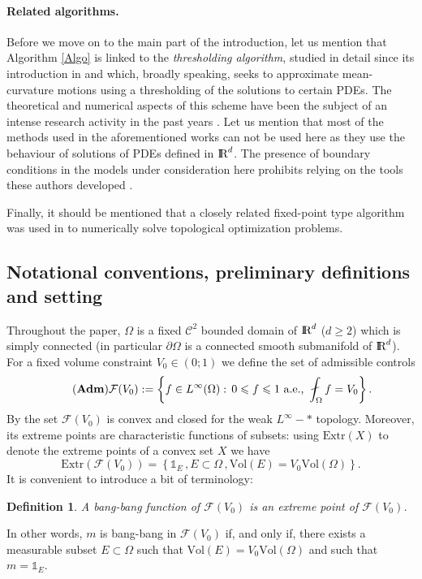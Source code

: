 \documentclass{article}
\newcommand{\R}{\textnormal{I\kern-0.21emR}}
\renewcommand{\geq}{\geqslant}
\renewcommand{\leq}{\leqslant}
\newtheorem{definition}[material]{Definition}
\def\O{{\Omega}}
\numberwithin{equation}{section}
\begin{document}
 \paragraph{Related algorithms.}
 Before we move on to the main part of the introduction, let us mention that Algorithm \ref{Algo} is linked to the \emph{thresholding algorithm}, studied in detail since its introduction in \cite{MBO} and which, broadly speaking, seeks to approximate mean-curvature motions using a thresholding of the solutions to certain PDEs. The theoretical and numerical aspects of this scheme have been the subject of an intense research activity in the past years \cite{Barles_1995,evans1993convergence,ishii1995generalization,ISHII_1999,laux2016convergence,Laux_2017,ruuth2001diffusion,Swartz_2017}. Let us mention that most of the methods used in the aforementioned works can not be used here as they use the behaviour of solutions of PDEs defined in $\R^d$. The presence of boundary conditions in the models under consideration here prohibits relying on the tools these authors developed .

Finally, it should be mentioned that a closely related fixed-point type algorithm was used in \cite{MR2235384,MR2837788} to numerically solve topological optimization problems.

\subsection{Notational conventions, preliminary definitions and setting}\label{Se:IntroPreliminaire}
Throughout the paper, $\O$ is a fixed $\mathscr C^2$ bounded domain of $\R^d$ ($d\geq 2$) which is simply connected (in particular $\partial \O$ is a connected smooth submanifold of $\R^d$). For a fixed volume constraint $V_0\in (0;1)$ we define the set of admissible controls 
\begin{equation}\tag{$\bold{Adm}$}
\mathcal F(V_0):=\left\{f\in L^\infty(\O):\, 0\leq f\leq 1\text{ a.e., } \fint_\O f=V_0\right\}.
\end{equation}
By \cite[Proposition 7.2.17]{HenrotPierre} the set $\mathcal F(V_0)$ is convex and closed for the weak $L^\infty-*$ topology. Moreover, its extreme points are characteristic functions of subsets: using $\mathrm{Extr}(X)$ to denote the extreme points of a convex set $X$ we have 
\[ \mathrm{Extr}(\mathcal F(V_0))=\left\{\mathds 1_E\,, E\subset \O\,, \mathrm{Vol}(E)=V_0\mathrm{Vol}(\O)\right\}.\] It is convenient to introduce a bit of terminology:
\begin{definition}\label{De:BangBang}
A bang-bang function of $\mathcal F(V_0)$ is an extreme point of $\mathcal F(V_0)$. 
\end{definition}
In other words, $m$ is bang-bang in $\mathcal F(V_0)$ if, and only if, there exists a measurable subset $E\subset \O$ such that $\mathrm{Vol}(E)=V_0\mathrm{Vol}(\O)$ and such that $m=\mathds 1_E$.
\end{document}
